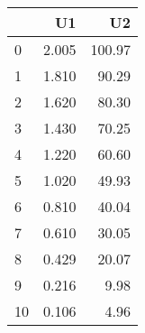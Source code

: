 \begin{tabular}{lrr}
\toprule
{} &     U1 &      U2 \\
\midrule
0  &  2.005 &  100.97 \\
1  &  1.810 &   90.29 \\
2  &  1.620 &   80.30 \\
3  &  1.430 &   70.25 \\
4  &  1.220 &   60.60 \\
5  &  1.020 &   49.93 \\
6  &  0.810 &   40.04 \\
7  &  0.610 &   30.05 \\
8  &  0.429 &   20.07 \\
9  &  0.216 &    9.98 \\
10 &  0.106 &    4.96 \\
\bottomrule
\end{tabular}
